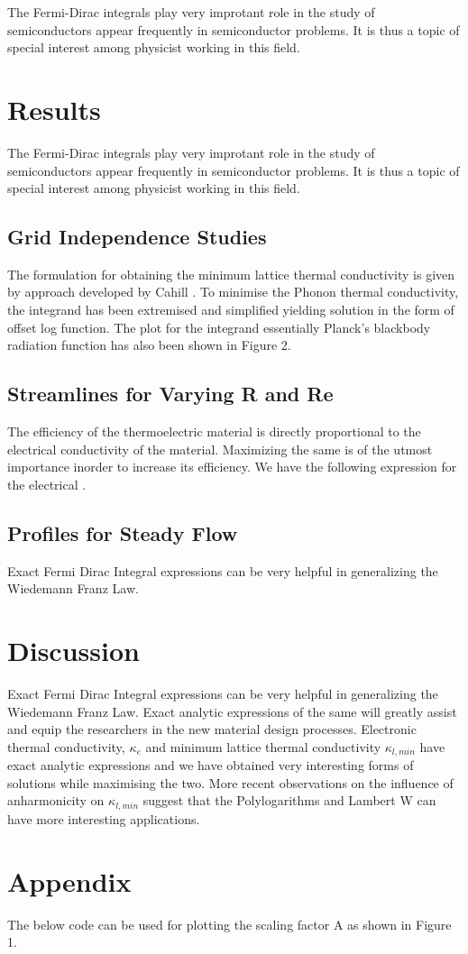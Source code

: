 \documentclass{article}
\begin{document}
The Fermi-Dirac integrals play very improtant role in the study of semiconductors appear frequently in semiconductor problems. It is thus a topic of special interest among physicist working in this field.

\section{Results}
The Fermi-Dirac integrals play very improtant role in the study of semiconductors appear frequently in semiconductor problems. It is thus a topic of special interest among physicist working in this field.

\subsection{Grid Independence Studies}
The formulation for obtaining the minimum lattice thermal conductivity is given by approach developed by Cahill \citep{PhysRevB.46.6131}. To minimise the Phonon thermal conductivity, the integrand has been extremised and simplified yielding solution in the form of offset log function. The plot for the integrand essentially Planck's blackbody radiation function has also been shown in Figure 2.

\subsection{Streamlines for Varying R and Re}
The efficiency of the thermoelectric material is directly proportional to the electrical conductivity of the material. Maximizing the same is of the utmost importance inorder to increase its efficiency. We have the following expression for the electrical . \citep{articleSRV}


\subsection{Profiles for Steady Flow}

Exact Fermi Dirac Integral expressions can be very helpful in generalizing the Wiedemann Franz  Law. 

\section{Discussion}

Exact Fermi Dirac Integral expressions can be very helpful in generalizing the Wiedemann Franz  Law. Exact analytic expressions of the same will greatly assist and equip the researchers in the new material design processes.  Electronic thermal conductivity, $\kappa_e$ and minimum lattice thermal conductivity $\kappa_{l,min}$  have exact analytic expressions and we have obtained very interesting forms of solutions while maximising the two. More recent observations on the influence of anharmonicity on  $\kappa_{l,min}$  suggest that the Polylogarithms and Lambert W can have more interesting applications.

\section*{Appendix}
The below code can be used for plotting the scaling factor A as shown in Figure 1.




\end{document}
